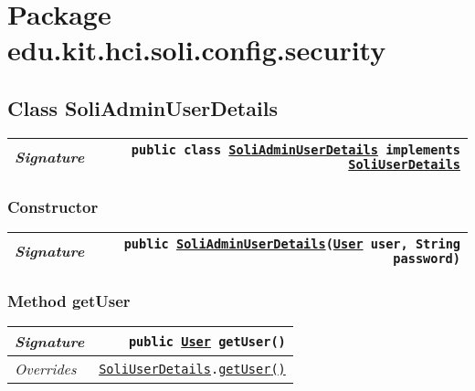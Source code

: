 

\section{Package edu.kit.hci.soli.config.security}
\begin{adjustwidth}{1.5em}{0pt}
  \subsection{Class SoliAdminUserDetails\label{edu.kit.hci.soli.config.security.SoliAdminUserDetails} }
  \begin{adjustwidth}{1.5em}{0pt}
    {\begin{tabularx}{1.0\linewidth}{@{}l R@{}}
      \emph{Signature} & \texttt{public  class \texttt{\hyperref[edu.kit.hci.soli.config.security.SoliAdminUserDetails]{\texttt{SoliAdminUserDetails}} implements \texttt{\hyperref[edu.kit.hci.soli.config.security.SoliUserDetails]{\texttt{SoliUserDetails}}}}} \\
      \hline
  
    \end{tabularx}}\subsubsection{Constructor\label{edu.kit.hci.soli.config.security.SoliAdminUserDetails@edu.kit.hci.soli.config.security.SoliAdminUserDetails(edu.kit.hci.soli.domain.User,java.lang.String)}}
    \begin{adjustwidth}{1.5em}{0pt}
      {\begin{tabularx}{1.0\linewidth}{@{}l R@{}}
        \emph{Signature} & \texttt{public \texttt{\hyperref[edu.kit.hci.soli.config.security.SoliAdminUserDetails]{\texttt{SoliAdminUserDetails}}}(\texttt{\hyperref[edu.kit.hci.soli.domain.User]{\texttt{User}}} user, \texttt{String} password)} \\
        \hline
  
      \end{tabularx}}
    \end{adjustwidth}\subsubsection{Method getUser\label{edu.kit.hci.soli.config.security.SoliAdminUserDetails@getUser()}}
    \begin{adjustwidth}{1.5em}{0pt}
      {\begin{tabularx}{1.0\linewidth}{@{}l R@{}}
        \emph{Signature} & \texttt{public \texttt{\hyperref[edu.kit.hci.soli.domain.User]{\texttt{User}}} getUser()} \\
        \hline
        \emph{Overrides} & \texttt{\texttt{\hyperref[edu.kit.hci.soli.config.security.SoliUserDetails]{\texttt{SoliUserDetails}}}.\hyperref[edu.kit.hci.soli.config.security.SoliUserDetails@getUser()]{getUser}\hyperref[edu.kit.hci.soli.config.security.SoliUserDetails@getUser()]{(}\hyperref[edu.kit.hci.soli.config.security.SoliUserDetails@getUser()]{)}} \\
        \hline
  

\end{tabularx}}
\end{adjustwidth}
\end{adjustwidth}
\end{adjustwidth}
